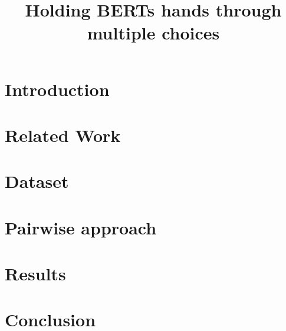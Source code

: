 \documentclass[10pt, a4paper]{article}
\title{Holding BERTs hands through multiple choices}
\begin{document}
\maketitleabstract

\section{Introduction} \label{intro}


\section{Related Work}
 \label{related-work}

\section{Dataset} \label{dataset}


\section{Pairwise approach} \label{approach}


\section{Results} \label{results}


\section{Conclusion}
 \label{conclusion}


 
\end{document}

